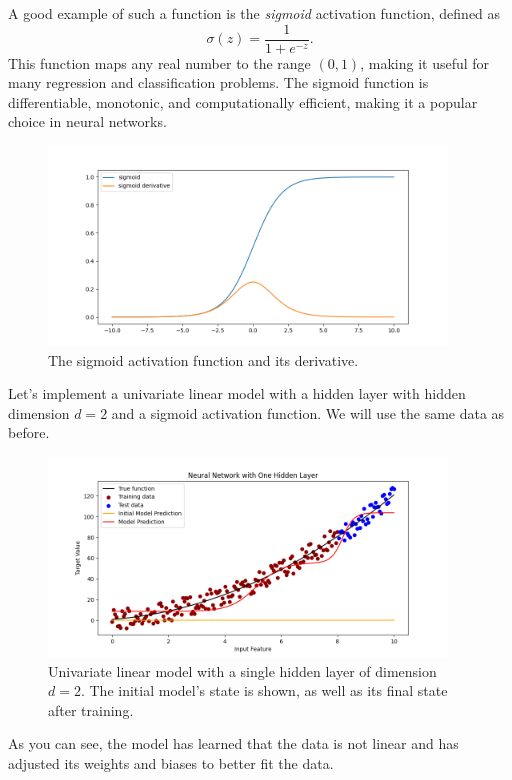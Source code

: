A good example of such a function is the \emph{sigmoid} activation function, defined as $$\sigma(z) = \frac{1}{1 + e^{-z}}.$$ This function maps any real number to the range $(0,1)$, making it useful for many regression and classification problems. The sigmoid function is differentiable, monotonic, and computationally efficient, making it a popular choice in neural networks.

\begin{figure}[H]
\centering
\includegraphics[width=300pt]{Regression/code/sigmoid.png}
\caption{The sigmoid activation function and its derivative.}
\label{fig:linear9}
\end{figure}

Let's implement a univariate linear model with a hidden layer with hidden dimension $d=2$ and a sigmoid activation function. We will use the same data as before.



\begin{figure}[H]
    \centering
    \includegraphics[width=300pt]{Regression/code/neural-network1.png}
    \caption{Univariate linear model with a single hidden layer of dimension $d=2$. The initial model's state is shown, as well as its final state after training.}
    \label{fig:linear10}
\end{figure}

As you can see, the model has learned that the data is not linear and has adjusted its weights and biases to better fit the data. 

